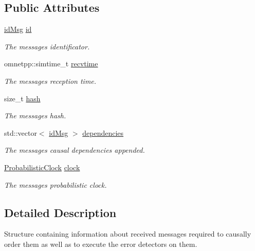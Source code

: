 \subsection*{Public Attributes}
\begin{DoxyCompactItemize}
\item 
\hyperlink{structures_8h_a83a1d9a070efa5341da84cfd8e28d3e5}{id\+Msg} \hyperlink{structs__message_info_a6c2928774199848fd25b4e8ffb7870c2}{id}
\begin{DoxyCompactList}\small\item\em The message\textquotesingle{}s identificator. \end{DoxyCompactList}\item 
omnetpp\+::simtime\+\_\+t \hyperlink{structs__message_info_a3600b24205dc07ce06774af44976c107}{recvtime}
\begin{DoxyCompactList}\small\item\em The message\textquotesingle{}s reception time. \end{DoxyCompactList}\item 
size\+\_\+t \hyperlink{structs__message_info_a9b627c36e814fbbd04a89bc6e827e4ff}{hash}
\begin{DoxyCompactList}\small\item\em The message\textquotesingle{}s hash. \end{DoxyCompactList}\item 
std\+::vector$<$ \hyperlink{structures_8h_a83a1d9a070efa5341da84cfd8e28d3e5}{id\+Msg} $>$ \hyperlink{structs__message_info_a82f52cb53fb0e9b1b985f173f3a013be}{dependencies}
\begin{DoxyCompactList}\small\item\em The message\textquotesingle{}s causal dependencies appended. \end{DoxyCompactList}\item 
\hyperlink{class_probabilistic_clock}{Probabilistic\+Clock} \hyperlink{structs__message_info_ad35ea02bbca3d54d5b150bb6ea476888}{clock}
\begin{DoxyCompactList}\small\item\em The message\textquotesingle{}s probabilistic clock. \end{DoxyCompactList}\end{DoxyCompactItemize}


\subsection{Detailed Description}
Structure containing information about received messages required to causally order them as well as to execute the error detectors on them. 

